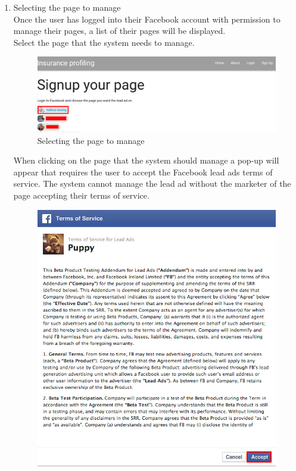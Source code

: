 \documentclass{article}
\begin{document}
\begin{enumerate}
			\item Selecting the page to manage\\
				Once the user has logged into their Facebook account with permission to manage their pages, a list of their pages will be displayed.\\
				Select the page that the system needs to manage.\\
				\begin{figure}[H]
				  \centering
				      \includegraphics[width=\textwidth]{images/select_page.png}
				  \caption{Selecting the page to manage}
				  \label{fig:selectPage}
				\end{figure}
				When clicking on the page that the system should manage a pop-up will appear that requires the user to accept the Facebook lead ads terms of service. The system cannot manage the lead ad without the marketer of the page accepting their terms of service.\\
				\begin{figure}[H]
					\centering
						\includegraphics[width=\textwidth]{images/facebook_tos.png}

\end{figure}
\end{enumerate}
\end{document}
